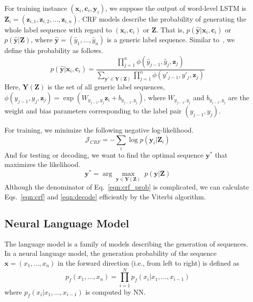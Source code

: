 \documentclass[letterpaper]{article} %
\def \c {\mathbf{c}}
\def \x {\mathbf{x}}
\def \y {\mathbf{y}}
\def \z {\mathbf{z}}
\def \Y {\mathbf{Y}}
\def \Z {\mathbf{Z}}
\begin{document}
For training instance $(\x_i, \c_i, \y_i)$, we suppose the output of word-level LSTM is $\Z_i=(\z_{i, 1}, \z_{i, 2}, \dots, \z_{i, n})$.
CRF models describe the probability of generating the whole label sequence with regard to $(\x_i, \c_i)$ or $\Z$.
That is, $p(\hat{\y} | \x_i, \c_i)$ or $p(\hat{\y} | \Z)$, where $\hat{\y} = (\hat{y}_1, \dots, \hat{y}_n)$ is a generic label sequence.
Similar to~\cite{ma-hovy:2016:P16-1}, we define this probability as follows.
\begin{equation}
p(\hat{\y}|\x_i, \c_i) = \frac{ \prod_{j=1}^n \phi(\hat{y}_{j-1}, \hat{y}_j, \z_j) } { \sum_{\y' \in \Y(\Z)} \prod_{j=1}^n \phi(y'_{j-1}, y'_j, \z_j)}
\label{eqn:crf_prob}
\end{equation}
Here, $\Y(\Z)$ is the set of all generic label sequences, $\phi(y_{j-1}, y_j, \z_j) = \exp(W_{y_{j-1}, y_{j}} \z_i + b_{y_{j-1}, y_{j}})$, where $W_{y_{j-1}, y_{j}}$ and $b_{y_{j-1}, y_{j}}$ are the weight and bias parameters corresponding to the label pair $(y_{j-1}, y_{j})$.

For training, we minimize the following negative log-likelihood.
\begin{equation}
\mathcal{J}_{CRF} = -\sum_i \log p(\y_i | \Z_i)
\label{eqn:crf}
\end{equation}
And for testing or decoding, we want to find the optimal sequence $\y^*$ that maximizes the likelihood.
\begin{equation}
\y^* = \arg \underset{\y \in \Y(\Z)}{{\max}} \; p(\y | \Z)
\label{eqn:decode}
\end{equation}
Although the denominator of Eq.~\ref{eqn:crf_prob} is complicated, we can calculate Eqs.~\ref{eqn:crf} and \ref{eqn:decode} efficiently by the Viterbi algorithm.

\subsection{Neural Language Model}

The language model is a family of models describing the generation of sequences.
In a neural language model, the generation probability of the sequence $\x = (x_1, ..., x_n)$ in the forward direction (i.e., from left to right) is defined as
$$
p_f(x_1, ..., x_n) = \prod_{i=1}^N p_f(x_i| x_1, \dots, x_{i-1})
$$
where $p_f(x_i| x_1, \dots, x_{i-1})$ is computed by NN.
\end{document}

